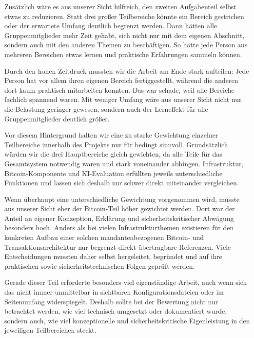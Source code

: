 Zusätzlich wäre es aus unserer Sicht hilfreich, den zweiten Aufgabenteil selbst etwas zu reduzieren. Statt drei großer Teilbereiche könnte ein Bereich gestrichen oder der erwartete Umfang deutlich begrenzt werden. Dann hätten alle Gruppenmitglieder mehr Zeit gehabt, sich nicht nur mit dem eigenen Abschnitt, sondern auch mit den anderen Themen zu beschäftigen. So hätte jede Person aus mehreren Bereichen etwas lernen und praktische Erfahrungen sammeln können.

Durch den hohen Zeitdruck mussten wir die Arbeit am Ende stark aufteilen: Jede Person hat vor allem ihren eigenen Bereich fertiggestellt, während die anderen dort kaum praktisch mitarbeiten konnten. Das war schade, weil alle Bereiche fachlich spannend waren. Mit weniger Umfang wäre aus unserer Sicht nicht nur die Belastung geringer gewesen, sondern auch der Lerneffekt für alle Gruppenmitglieder deutlich größer.

Vor diesem Hintergrund halten wir eine zu starke Gewichtung einzelner Teilbereiche innerhalb des Projekts nur für bedingt sinnvoll. Grundsätzlich würden wir die drei Hauptbereiche gleich gewichten, da alle Teile für das Gesamtsystem notwendig waren und stark voneinander abhingen. Infrastruktur, Bitcoin-Komponente und \acs{KI}-Evaluation erfüllten jeweils unterschiedliche Funktionen und lassen sich deshalb nur schwer direkt miteinander vergleichen.

Wenn überhaupt eine unterschiedliche Gewichtung vorgenommen wird, müsste aus unserer Sicht eher der Bitcoin-Teil höher gewichtet werden. Dort war der Anteil an eigener Konzeption, Erklärung und sicherheitskritischer Abwägung besonders hoch. Anders als bei vielen Infrastrukturthemen existieren für den konkreten Aufbau einer solchen mandantenbezogenen Bitcoin- und Transaktionsarchitektur nur begrenzt direkt übertragbare Referenzen. Viele Entscheidungen mussten daher selbst hergeleitet, begründet und auf ihre praktischen sowie sicherheitstechnischen Folgen geprüft werden.

Gerade dieser Teil erforderte besonders viel eigenständige Arbeit, auch wenn sich das nicht immer unmittelbar in sichtbaren Konfigurationsdateien oder im Seitenumfang widerspiegelt. Deshalb sollte bei der Bewertung nicht nur betrachtet werden, wie viel technisch umgesetzt oder dokumentiert wurde, sondern auch, wie viel konzeptionelle und sicherheitskritische Eigenleistung in den jeweiligen Teilbereichen steckt.
